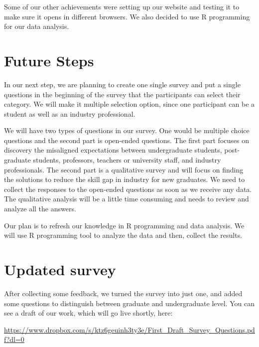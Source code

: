 \documentclass{sigchi}
\begin{document}
Some of our other achievements were setting up our website and testing it to make sure it opens in different browsers. We also decided to use R programming for our data analysis.

 \section{Future Steps}
In our next step, we are planning to create one single survey and put a single questions in the beginning of the survey that the participants can select their category. We will make it multiple selection option, since one participant can be a student as well as an industry professional.

We will have two types of questions in our survey. One would be multiple choice questions and the second part is open-ended questions. The first part focuses on discovery the misaligned expectations between undergraduate students, post-graduate students, professors, teachers or university staff, and industry professionals. The second part is a qualitative survey and will focus on finding the solutions to reduce the skill gap in industry for new graduates. We need to collect the responses to the open-ended questions as soon as we receive any data. The qualitative analysis will be a little time consuming and needs to review and analyze all the answers.

Our plan is to refresh our knowledge in R programming and data analysis. We will use R programming tool to analyze the data and then, collect the results.

\section{Updated survey}

After collecting some feedback, we turned the survey into just one, and added some questions to distinguish between graduate and undergraduate level. You can see a draft of our work, which will go live shortly, here:

\url{https://www.dropbox.com/s/ktz6geuinh3ty3e/First_Draft_Survey_Questions.pdf?dl=0}
 

\balance{}

\balance{}

%
%
\end{document}
